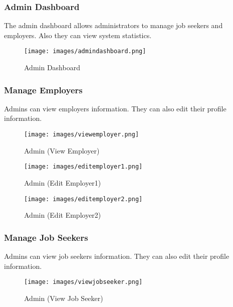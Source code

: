 \documentclass[a4paper,12pt]{article}
\begin{document}
\subsubsection{Admin Dashboard}
The admin dashboard allows administrators to manage job seekers and employers. Also they can view system statistics.

\begin{figure}[h!]
    \centering
    \texttt{[image: images/admindashboard.png]}
    \caption{Admin Dashboard}
    \label{fig:admin_dashboard}
\end{figure}

\newpage

\subsubsection{Manage Employers}
Admins can view employers information. They can also edit their profile information.

\begin{figure}[h!]
    \centering
    \texttt{[image: images/viewemployer.png]}
    \caption{Admin (View Employer)}
    \label{fig:admin_viewEmployer}
\end{figure}

\begin{figure}[h!]
    \centering
    \texttt{[image: images/editemployer1.png]}
    \caption{Admin (Edit Employer1)}
    \label{fig:admin_editEmployer1}
\end{figure}

\newpage

\begin{figure}[h!]
    \centering
    \texttt{[image: images/editemployer2.png]}
    \caption{Admin (Edit Employer2)}
    \label{fig:admin_editEmployer2}
\end{figure}


\subsubsection{Manage Job Seekers}
Admins can view job seekers information. They can also edit their profile information.

\begin{figure}[h!]
    \centering
    \texttt{[image: images/viewjobseeker.png]}
    \caption{Admin (View Job Seeker)}
    \label{fig:admin_viewJobSeeker}
\end{figure}
\end{document}
